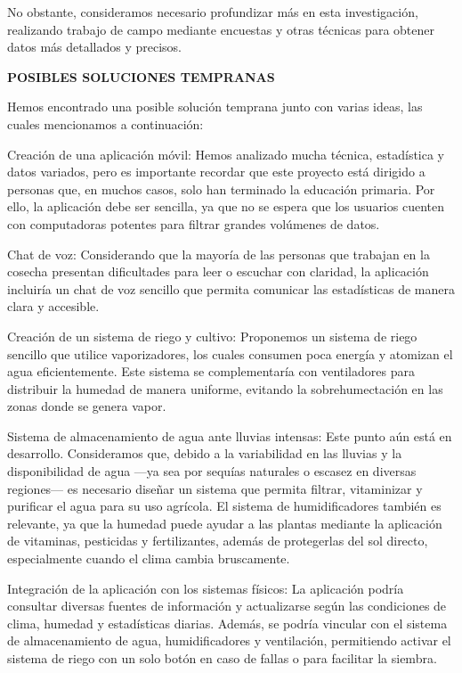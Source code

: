 \documentclass[12pt]{article}
\begin{document}
{{{{{{{{{			No obstante, consideramos necesario profundizar más en esta investigación, realizando trabajo de campo mediante encuestas y otras técnicas para obtener datos más detallados y precisos.
			\newpage
			\begin{center}
				{\huge \textbf{POSIBLES SOLUCIONES TEMPRANAS}}
			\end{center}
			\vspace{1cm} 
			{\large %
		Hemos encontrado una posible solución temprana junto con varias ideas, las cuales mencionamos a continuación:
		
		Creación de una aplicación móvil:
		Hemos analizado mucha técnica, estadística y datos variados, pero es importante recordar que este proyecto está dirigido a personas que, en muchos casos, solo han terminado la educación primaria. Por ello, la aplicación debe ser sencilla, ya que no se espera que los usuarios cuenten con computadoras potentes para filtrar grandes volúmenes de datos.
		
		Chat de voz:
		Considerando que la mayoría de las personas que trabajan en la cosecha presentan dificultades para leer o escuchar con claridad, la aplicación incluiría un chat de voz sencillo que permita comunicar las estadísticas de manera clara y accesible.
		
		Creación de un sistema de riego y cultivo:
		Proponemos un sistema de riego sencillo que utilice vaporizadores, los cuales consumen poca energía y atomizan el agua eficientemente. Este sistema se complementaría con ventiladores para distribuir la humedad de manera uniforme, evitando la sobrehumectación en las zonas donde se genera vapor.
		
		Sistema de almacenamiento de agua ante lluvias intensas:
		Este punto aún está en desarrollo. Consideramos que, debido a la variabilidad en las lluvias y la disponibilidad de agua —ya sea por sequías naturales o escasez en diversas regiones— es necesario diseñar un sistema que permita filtrar, vitaminizar y purificar el agua para su uso agrícola. El sistema de humidificadores también es relevante, ya que la humedad puede ayudar a las plantas mediante la aplicación de vitaminas, pesticidas y fertilizantes, además de protegerlas del sol directo, especialmente cuando el clima cambia bruscamente.
		
		Integración de la aplicación con los sistemas físicos:
		La aplicación podría consultar diversas fuentes de información y actualizarse según las condiciones de clima, humedad y estadísticas diarias. Además, se podría vincular con el sistema de almacenamiento de agua, humidificadores y ventilación, permitiendo activar el sistema de riego con un solo botón en caso de fallas o para facilitar la siembra.
		
}}}}}}}}}}
\end{document}
